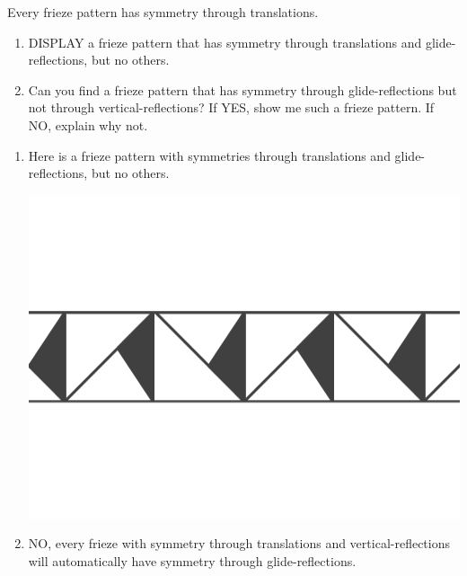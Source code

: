 \documentclass[noauthor,nooutcomes,12pt,hints,handout]{ximera}
\begin{document}
\begin{question}
  Every frieze pattern has symmetry through translations.
  \begin{enumerate}
    \item DISPLAY a frieze pattern that has symmetry through
      translations and glide-reflections, but no others.
    \item Can you find a frieze pattern that has symmetry through
    glide-reflections but not through vertical-reflections? If YES, show
    me such a frieze pattern. If NO, explain why not.
  \end{enumerate}
  \begin{freeResponse}
    \begin{enumerate}
      \item Here is a frieze pattern with symmetries through
        translations and glide-reflections, but no others.
        \begin{center}
          \includegraphics[width=.6\textwidth]{ansGR.png}
        \end{center}
      \item NO, every frieze with symmetry through translations and
        vertical-reflections will automatically have symmetry through
        glide-reflections.
    \end{enumerate}
  \end{freeResponse}
\end{question}
\mynewpage
\end{document}
